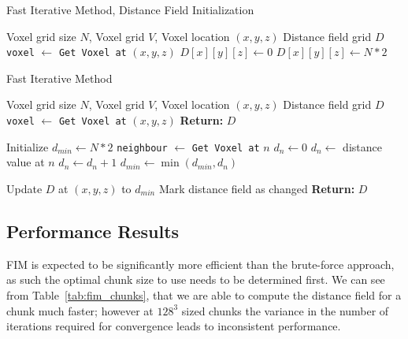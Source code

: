 \begin{algorithm}[H]
    \caption{Fast Iterative Method, Distance Field Initialization}
    \label{alg:fim_init}
    \begin{algorithmic}[1]
        \REQUIRE Voxel grid size \(N\), Voxel grid \(V\), Voxel location \((x, y, z)\)
        \ENSURE Distance field grid \(D\)
        \STATE \texttt{voxel} $\gets$ \texttt{Get Voxel at} \((x, y, z)\)
        \STATE \(D[x][y][z] \gets 0\)
        \ELSE
        \STATE \(D[x][y][z] \gets N * 2\)
        \ENDIF
    \end{algorithmic}
\end{algorithm}

\begin{algorithm}[H]
    \caption{Fast Iterative Method}
    \label{alg:fim}
    \begin{algorithmic}[1]
        \REQUIRE Voxel grid size \(N\), Voxel grid \(V\), Voxel location \((x, y, z)\)
        \ENSURE Distance field grid \(D\)
        \STATE \texttt{voxel} $\gets$ \texttt{Get Voxel at} \((x, y, z)\)
        \STATE \textbf{Return:} \(D\)
        \ENDIF

        \STATE Initialize $d_{min} \gets N * 2$
        \STATE \texttt{neighbour} $\gets$ \texttt{Get Voxel at} $n$
        \STATE $d_n \gets 0$
        \ELSE
        \STATE $d_n \gets$ distance value at $n$
        \ENDIF
        \STATE $d_n \gets d_n + 1$
        \STATE $d_{min} \gets \min(d_{min}, d_n)$
        \ENDFOR

        \STATE Update $D$ at $(x, y, z)$ to $d_{min}$
        \STATE Mark distance field as changed
        \ENDIF
        \STATE \textbf{Return:} \(D\)
    \end{algorithmic}
\end{algorithm}

\subsection{Performance Results}
FIM is expected to be significantly more efficient than the brute-force approach, as such the optimal chunk size to use
needs to be determined first. We can see from Table~\ref{tab:fim_chunks}, that we are able to compute the distance field
for a chunk much faster; however at $128^3$ sized chunks the variance in the number of iterations required for
convergence leads to inconsistent performance.


